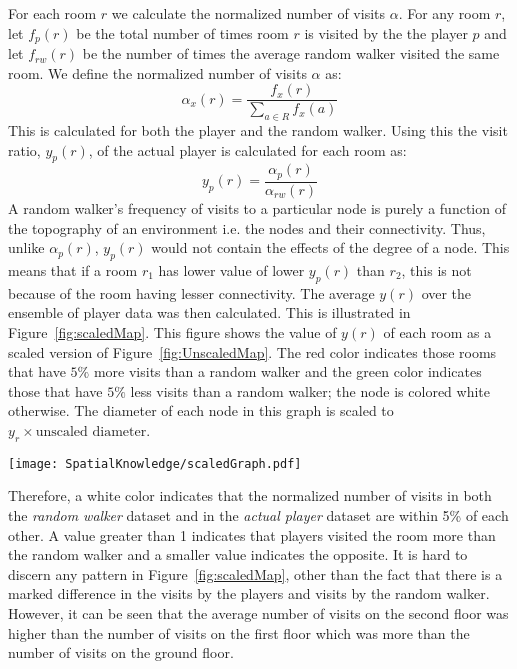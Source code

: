 For each room $r$ we calculate the normalized number of visits $\alpha$. For any room $r$, let $f_p(r)$ be the total number of times room $r$ is visited by the the player $p$ and let $f_{rw}(r)$ be the number of times the average random walker visited the same room. We define the normalized number of visits $\alpha$ as:
\begin{equation}
	\alpha_x(r) = \frac{f_x(r)}{\sum_{a \in R} f_x(a)}
	\label{eq:alpha_equation}
\end{equation}
This is calculated for both the player and the random walker. Using this the visit ratio, $y_{p}(r)$, of the actual player is calculated for each room as:
\begin{equation}
y_{p}(r) = \frac{\alpha_p(r)}{\alpha_{rw}(r)}
\label{eq:y_equation}
\end{equation}
A random walker's frequency of visits to a particular node is purely a function of the topography of an environment i.e. the nodes and their connectivity. Thus, unlike $\alpha_p(r)$, $y_p(r)$ would not contain the effects of the degree of a node. This means that if a room $r_1$ has lower value of lower $y_p(r)$ than $r_2$, this is not because of the room having lesser connectivity. The average $y(r)$ over the ensemble of player data was then calculated. This is illustrated in Figure~\ref{fig:scaledMap}. This figure shows the value of $y(r)$ of each room as a scaled version of Figure~\ref{fig:UnscaledMap}. The red color indicates those rooms that have $5\%$ more visits than a random walker and the green color indicates those that have $5\%$ less visits than a random walker; the node is colored white otherwise. The diameter of each node in this graph is scaled to $y_r \times \mbox {unscaled diameter}$.

\begin{sidewaysfigure*}[!htbp]
\centering
\texttt{[image: SpatialKnowledge/scaledGraph.pdf]}
\caption[Visualization of room visit frequencies]{Figure~\ref{fig:UnscaledMap} scaled by normalized number of visits as described in Equation~\ref{eq:y_equation}. Red color indicates a $y$ value of greater than $1.05$ and the green color indicates a value of less than $0.95$ . The diameter of each node in this graph is scaled to $y_r \times (unscaled\ diameter)$.}
\label{fig:scaledMap}
\end{sidewaysfigure*}

Therefore, a white color indicates that the normalized number of visits in both the \emph{random walker} dataset and in the \emph{actual player} dataset are within 5\% of each other. A value greater than 1 indicates that players visited the room more than the random walker and a smaller value indicates the opposite. It is hard to discern any pattern in Figure~\ref{fig:scaledMap}, other than the fact that there is a marked difference in the visits by the players and visits by the random walker. However, it can be seen that the average number of visits on the second floor was higher than the number of visits on the first floor which was more than the number of visits on the ground floor.

